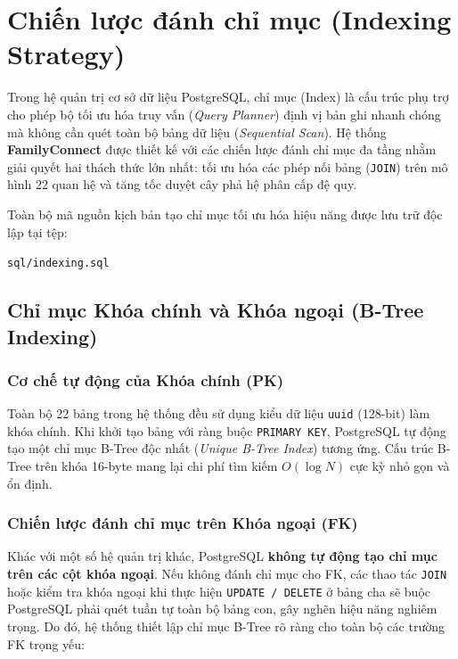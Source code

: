 \section{Chiến lược đánh chỉ mục (Indexing Strategy)}
\label{sec:3_3_chien_luoc_index}

Trong hệ quản trị cơ sở dữ liệu PostgreSQL, chỉ mục (Index) là cấu trúc phụ trợ cho phép bộ tối ưu hóa truy vấn (\textit{Query Planner}) định vị bản ghi nhanh chóng mà không cần quét toàn bộ bảng dữ liệu (\textit{Sequential Scan}). Hệ thống \textbf{FamilyConnect} được thiết kế với các chiến lược đánh chỉ mục đa tầng nhằm giải quyết hai thách thức lớn nhất: tối ưu hóa các phép nối bảng (\texttt{JOIN}) trên mô hình 22 quan hệ và tăng tốc duyệt cây phả hệ phân cấp đệ quy.

Toàn bộ mã nguồn kịch bản tạo chỉ mục tối ưu hóa hiệu năng được lưu trữ độc lập tại tệp:
\begin{center}
    \texttt{sql/indexing.sql}
\end{center}

\subsection{Chỉ mục Khóa chính và Khóa ngoại (B-Tree Indexing)}

\subsubsection{Cơ chế tự động của Khóa chính (PK)}
Toàn bộ 22 bảng trong hệ thống đều sử dụng kiểu dữ liệu \texttt{uuid} (128-bit) làm khóa chính. Khi khởi tạo bảng với ràng buộc \texttt{PRIMARY KEY}, PostgreSQL tự động tạo một chỉ mục B-Tree độc nhất (\textit{Unique B-Tree Index}) tương ứng. Cấu trúc B-Tree trên khóa 16-byte mang lại chi phí tìm kiếm $O(\log N)$ cực kỳ nhỏ gọn và ổn định.

\subsubsection{Chiến lược đánh chỉ mục trên Khóa ngoại (FK)}
Khác với một số hệ quản trị khác, PostgreSQL \textbf{không tự động tạo chỉ mục trên các cột khóa ngoại}. Nếu không đánh chỉ mục cho FK, các thao tác \texttt{JOIN} hoặc kiểm tra khóa ngoại khi thực hiện \texttt{UPDATE / DELETE} ở bảng cha sẽ buộc PostgreSQL phải quét tuần tự toàn bộ bảng con, gây nghẽn hiệu năng nghiêm trọng. Do đó, hệ thống thiết lập chỉ mục B-Tree rõ ràng cho toàn bộ các trường FK trọng yếu:


